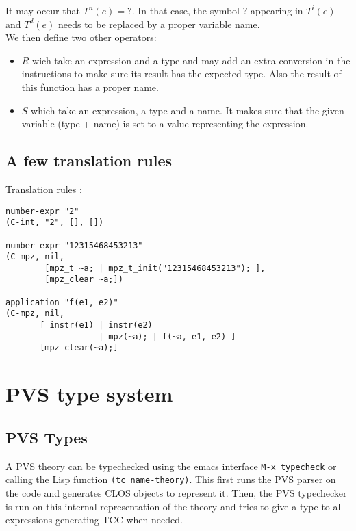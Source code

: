 \documentclass[12pt,a4paper]{article}
\newcommand{\cl}[1]{\texttt{#1}}
\begin{document}
It may occur that $T^n(e) = ?$. In that case, the symbol $?$ appearing in $T^i(e)$ and $T^d(e)$ needs to be replaced by a proper variable name.\\

We then define two other operators:
\begin{itemize}
\item $R$ wich take an expression and a type and may add an extra conversion in the instructions to make sure its result has the expected type. Also the result of this function has a proper name.
\item $S$ which take an expression, a type and a name. It makes sure that the given variable (type + name) is set to a value representing the expression.
\end{itemize}




\subsection{A few translation rules}

Translation rules :




\begin{lstlisting}
number-expr "2"
(C-int, "2", [], [])

number-expr "12315468453213"
(C-mpz, nil,
        [mpz_t ~a; | mpz_t_init("12315468453213"); ],
        [mpz_clear ~a;])

application "f(e1, e2)"
(C-mpz, nil,
       [ instr(e1) | instr(e2)
                   | mpz(~a); | f(~a, e1, e2) ]
       [mpz_clear(~a);]
\end{lstlisting}



\section{PVS type system}

\subsection{PVS Types}
A PVS theory can be typechecked using the emacs interface \cl{M-x typecheck} or calling the Lisp function \cl{(tc name-theory)}. This first runs the PVS parser on the code and generates CLOS objects to represent it. Then, the PVS typechecker is run on this internal representation of the theory and tries to give a type to all expressions generating TCC when needed.\\
\end{document}
